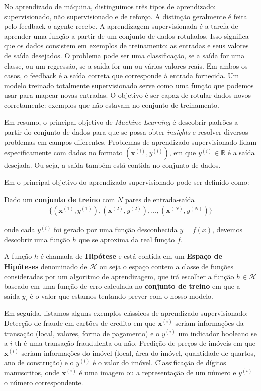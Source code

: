 No aprendizado de máquina, distinguimos três tipos de aprendizado: supervisionado, não supervisionado e de reforço. A distinção geralmente é feita pelo feedback o agente recebe.
A aprendizagem supervisionada é a tarefa de aprender uma função a partir de um conjunto de dados
rotulados. Isso significa que os dados consistem em exemplos de treinamento: as entradas e seus valores de saída desejados. O problema pode ser uma classificação, se a saída for uma
classe, ou um regressão, se a saída for um ou vários valores reais. Em ambos os casos, o feedback é
a saída correta que corresponde à entrada fornecida. Um modelo treinado totalmente supervisionado
serve como uma função que podemos usar para mapear novas entradas. O objetivo é ser capaz de
rotular dados novos corretamente: exemplos que não estavam no conjunto de treinamento. 

Em resumo, o principal objetivo de \textit{Machine Learning} é descobrir padrões a partir do conjunto de dados para que se possa obter \textit{insights} e resolver diversos problemas em campos diferentes. Problemas de aprendizado supervisionado lidam especificamente com dados no formato $(\mathbf{x}^{(i)},y^{(i)})$, em que $y^{(i)}\in\mathbb{R}$ é a saída desejada. Ou seja, a saída também está contida no conjunto de dados.

Em \cite{russel} o principal objetivo do aprendizado supervisionado pode ser definido como:

Dado um \textbf{conjunto de treino} com $N$ pares de entrada-saída 
\begin{gather*}
    \{(\mathbf{x}^{(1)},y^{(1)}),(\mathbf{x}^{(2)},y^{(2)}),...,(\mathbf{x}^{(N)},y^{(N)})\}
\end{gather*}

onde cada $y^{(i)}$ foi gerado por uma função desconhecida $y=f(x)$, devemos descobrir uma função $h$ que se aproxima da real função $f$.

A função $h$ é chamada de \textbf{Hipótese} e está contida em um \textbf{Espaço de Hipóteses} denominado de $\mathcal{H}$ ou seja o espaço contem a classe de funções consideradas por um algoritmo de aprendizagem, que irá escolher a função $h \in \mathcal{H}$ baseado em uma função de erro calculada no \textbf{conjunto de treino} em que a saída $y_i$ é o valor que estamos tentando prever com o nosso modelo.

Em seguida, listamos alguns exemplos clássicos de aprendizado supervisionado: Detecção de fraude em cartões de credito em que $\mathbf{x}^{(i)}$ seriam informações da transação (local, valores, forma de pagamento) e o ${y}^{(i)}$ um indicador booleano se a $i$-th é uma transação fraudulenta ou não. Predição de preços de imóveis em que $\mathbf{x}^{(i)}$ seriam informações do imóvel (local, área do imóvel, quantidade de quartos, ano de construção) e o ${y}^{(i)}$ é o valor do imóvel. Classificação de dígitos manuscritos, onde $\mathbf{x}^{(i)}$ é uma imagem ou a
representação de um número e ${y}^{(i)}$ o número correspondente.

